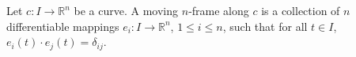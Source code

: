 Let $c: I \to \mathbb{R}^n$ be a curve. A moving $n$-frame along $c$ is a collection of $n$ differentiable mappings $e_i: I \to \mathbb{R}^n$, $1 \leq i \leq n$, such that for all $t \in I$, $e_i(t) \cdot e_j(t) = \delta_{ij}$.